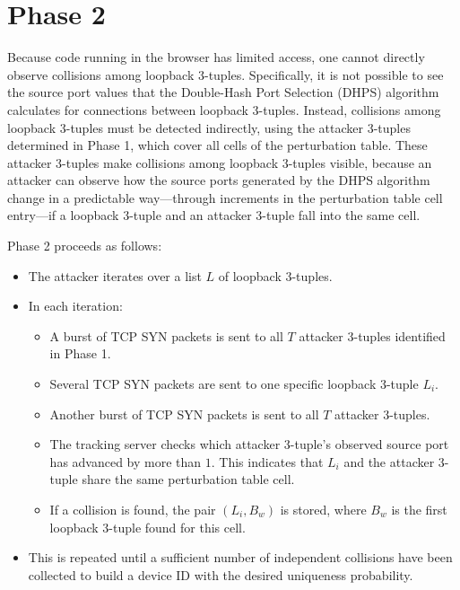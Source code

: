 \documentclass{report}
\begin{document}
\begin{center}
	\begin{minipage}[t]{0.5\textwidth}
		\vspace{0cm}

		
	\end{minipage}
\end{center}


\section{Phase 2}
\label{sec:phase 2}

Because code running in the browser has limited access, one cannot directly observe collisions among loopback 3-tuples. Specifically, it is not possible to see the source port values that the Double-Hash Port Selection (DHPS) algorithm calculates for connections between loopback 3-tuples. Instead, collisions among loopback 3-tuples must be detected indirectly, using the attacker 3-tuples determined in Phase 1, which cover all cells of the perturbation table. These attacker 3-tuples make collisions among loopback 3-tuples visible, because an attacker can observe how the source ports generated by the DHPS algorithm change in a predictable way—through increments in the perturbation table cell entry—if a loopback 3-tuple and an attacker 3-tuple fall into the same cell.

Phase 2 proceeds as follows:

\begin{itemize}
	\item The attacker iterates over a list $L$ of loopback 3-tuples.
	\item In each iteration:
	\begin{itemize}
		\item A burst of TCP SYN packets is sent to all $T$ attacker 3-tuples identified in Phase 1.
		\item Several TCP SYN packets are sent to one specific loopback 3-tuple $L_i$.
		\item Another burst of TCP SYN packets is sent to all $T$ attacker 3-tuples.
		\item The tracking server checks which attacker 3-tuple’s observed source port has advanced by more than $1$. This indicates that $L_i$ and the attacker 3-tuple share the same perturbation table cell.
		\item If a collision is found, the pair $(L_i, B_w)$ is stored, where $B_w$ is the first loopback 3-tuple found for this cell.
	\end{itemize}
	\item This is repeated until a sufficient number of independent collisions have been collected to build a device ID with the desired uniqueness probability.
\end{itemize}
\end{document}
